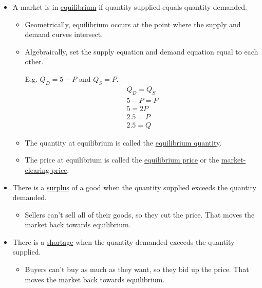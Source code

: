	\begin{itemize}

	\item A market is in \underline{equilibrium} if quantity supplied equals quantity demanded.
	
		\begin{itemize}
		
		\item Geometrically, equilibrium occurs at the point where the supply and demand curves intersect.
		
		\item Algebraically, set the supply equation and demand equation equal to each other. \newline
		
			E.g. $Q_D = 5 - P$ and $Q_S = P$.
				\begin{gather*}
				Q_D = Q_S \\
				5 - P = P \\
				5 = 2P \\
				2.5 = P \\
				2.5 = Q
				\end{gather*}
	
		\item The quantity at equilibrium is called the \underline{equilibrium quantity}.
	
		\item The price at equilibrium is called the \underline{equilibrium price} or the \underline{market-clearing price}.
	
		\end{itemize}
	
	\item There is a \underline{surplus} of a good when the quantity supplied exceeds the quantity demanded.
	
		\begin{itemize}
		
		\item Sellers can't sell all of their goods, so they cut the price. That moves the market back towards equilibrium.
		
		\end{itemize}
		
	\item There is a \underline{shortage} when the quantity demanded exceeds the quantity supplied.
	
		\begin{itemize}
		
		\item Buyers can't buy as much as they want, so they bid up the price. That moves the market back towards equilibrium. 
		

\end{itemize}
\end{itemize}
